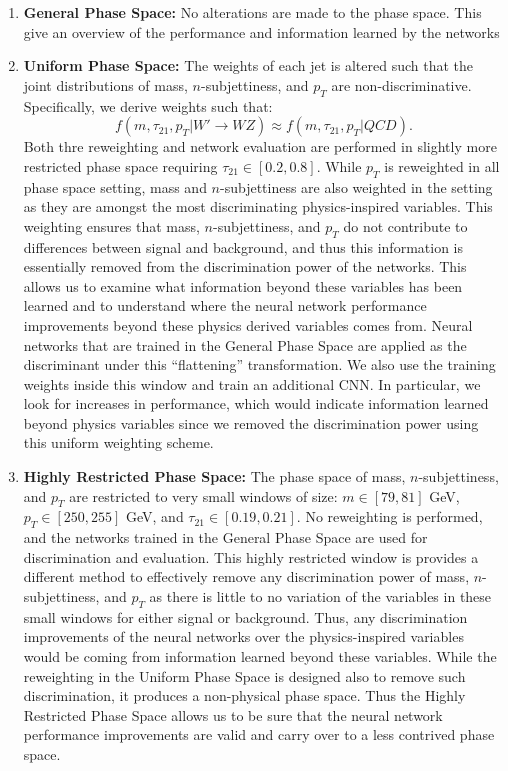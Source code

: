 \begin{enumerate}

\item \textbf{General Phase Space:} No alterations are made to the phase space.  This give an overview of the performance and information learned by the networks

\item  \textbf{Uniform Phase Space:}  The weights of each jet is altered such that the joint distributions of mass, $n$-subjettiness, and $p_T$ are non-discriminative.  Specifically, we derive weights such that:
\begin{equation}
  f(m, \tau_{21}, p_T| W'\rightarrow WZ) \approx f(m, \tau_{21}, p_T| QCD).
\end{equation}
Both thre reweighting and network evaluation are performed in slightly more restricted phase space requiring $\tau_{21}\in [0.2, 0.8]$. While $p_T$ is reweighted in all phase space setting, mass and $n$-subjettiness are also weighted in the setting as they are amongst the most discriminating physics-inspired variables.  This weighting ensures that mass, $n$-subjettiness, and $p_T$ do not contribute to differences between signal and background, and thus this information is essentially removed from the discrimination power of the networks.  This allows us to examine what information beyond these variables has been learned and to understand where the neural network performance improvements beyond these physics derived variables comes from.  Neural networks that are trained in the General Phase Space are applied as the discriminant under this ``flattening'' transformation. We also use the training weights inside this window and train an additional CNN. In particular, we look for increases in performance, which would indicate information learned beyond physics variables since we removed the discrimination power using this uniform weighting scheme.

\item \textbf{Highly Restricted Phase Space:} The phase space of mass, $n$-subjettiness, and $p_T$ are restricted to very small windows of size: $m\in [79, 81]$ GeV,  $p_T \in [250, 255]$ GeV, and  $\tau_21 \in [0.19, 0.21]$. No reweighting is performed, and the networks trained in the General Phase Space are used for discrimination and evaluation.  This highly restricted window is provides a different method to effectively remove any discrimination power of mass, $n$-subjettiness, and $p_T$ as there is little to no variation of the variables in these small windows for either signal or background.  Thus, any discrimination improvements of the neural networks over the physics-inspired variables would be coming from information learned beyond these variables.  While the reweighting in the Uniform  Phase Space is designed also to remove such discrimination, it produces a non-physical phase space.  Thus the Highly Restricted Phase Space allows us to be sure that the neural network performance improvements are valid and carry over to a less contrived phase space.

\end{enumerate}
